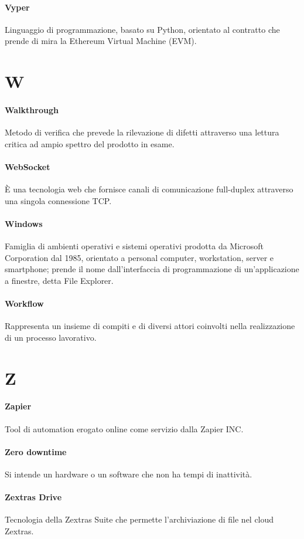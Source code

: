 \documentclass[]{article}
\begin{document}
	\paragraph*{Vyper}
	Linguaggio di programmazione, basato su Python, orientato al contratto che prende di mira la Ethereum Virtual Machine (EVM).

	\newpage

	\section*{W}

	\paragraph*{Walkthrough}
	Metodo di verifica che prevede la rilevazione di difetti attraverso una lettura critica ad ampio spettro del prodotto in esame.

	\paragraph*{WebSocket}
	È una tecnologia web che fornisce canali di comunicazione full-duplex attraverso una singola connessione TCP.

	\paragraph*{Windows}
	Famiglia di ambienti operativi e sistemi operativi prodotta da Microsoft Corporation dal 1985, orientato a personal computer, workstation, server e smartphone; prende il nome dall'interfaccia di programmazione di un'applicazione a finestre, detta File Explorer.

	\paragraph*{Workflow}
	Rappresenta un insieme di compiti e di diversi attori coinvolti nella realizzazione di un processo lavorativo.

	\newpage

	\section*{Z}

	\paragraph*{Zapier}
	Tool di automation erogato online come servizio dalla Zapier INC.

	\paragraph*{Zero downtime}
	Si intende un hardware o un software che non ha tempi di inattività.

	\paragraph*{Zextras Drive}
	Tecnologia della Zextras Suite che permette l'archiviazione di file nel cloud Zextras.
\end{document}
